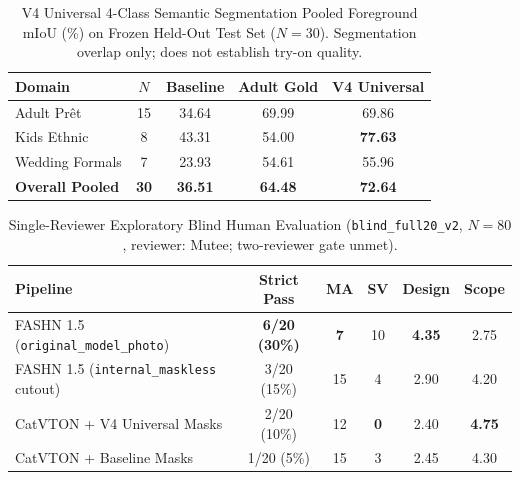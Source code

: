 
\begin{table}[t]
\centering
\caption{V4 Universal 4-Class Semantic Segmentation Pooled Foreground mIoU (\%) on Frozen Held-Out Test Set ($N=30$). Segmentation overlap only; does not establish try-on quality.}
\label{tab:segformer_v4}
\begin{tabular}{lcccc}
\hline
\textbf{Domain} & \textbf{$N$} & \textbf{Baseline} & \textbf{Adult Gold} & \textbf{V4 Universal} \\
\hline
Adult Pr\^{e}t & 15 & 34.64 & 69.99 & 69.86 \\
Kids Ethnic & 8 & 43.31 & 54.00 & \textbf{77.63} \\
Wedding Formals & 7 & 23.93 & 54.61 & 55.96 \\
\hline
\textbf{Overall Pooled} & \textbf{30} & \textbf{36.51} & \textbf{64.48} & \textbf{72.64} \\
\hline
\end{tabular}
\end{table}

\begin{table}[t]
\centering
\caption{Single-Reviewer Exploratory Blind Human Evaluation (\texttt{blind\_full20\_v2}, $N=80$, reviewer: Mutee; two-reviewer gate unmet).}
\label{tab:human_eval_v4}
\begin{tabular}{lccccc}
\hline
\textbf{Pipeline} & \textbf{Strict Pass} & \textbf{MA} & \textbf{SV} & \textbf{Design} & \textbf{Scope} \\
\hline
FASHN 1.5 (\texttt{original\_model\_photo}) & \textbf{6/20 (30\%)} & \textbf{7} & 10 & \textbf{4.35} & 2.75 \\
FASHN 1.5 (\texttt{internal\_maskless} cutout) & 3/20 (15\%) & 15 & 4 & 2.90 & 4.20 \\
CatVTON + V4 Universal Masks & 2/20 (10\%) & 12 & \textbf{0} & 2.40 & \textbf{4.75} \\
CatVTON + Baseline Masks & 1/20 (5\%) & 15 & 3 & 2.45 & 4.30 \\
\hline
\end{tabular}
\end{table}
